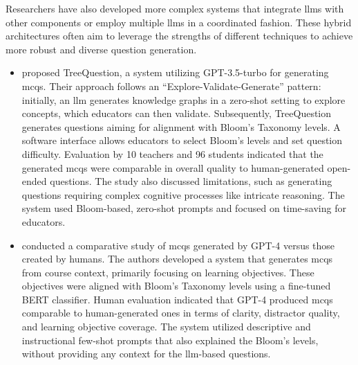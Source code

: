  Researchers have also developed more complex systems that integrate \ac{llms} with other components or employ multiple \ac{llms} in a coordinated fashion. These hybrid architectures often aim to leverage the strengths of different techniques to achieve more robust and diverse question generation.
\begin{itemize}
    \item \cite{cheng_treequestion_2024} proposed TreeQuestion, a system utilizing GPT-3.5-turbo for generating \ac{mcqs}. Their approach follows an \enquote{Explore-Validate-Generate} pattern: initially, an \ac{llm} generates knowledge graphs in a zero-shot setting to explore concepts, which educators can then validate. Subsequently, TreeQuestion generates questions aiming for alignment with Bloom's Taxonomy levels. A software interface allows educators to select Bloom's levels and set question difficulty. Evaluation by 10 teachers and 96 students indicated that the generated \ac{mcqs} were comparable in overall quality to human-generated open-ended questions. The study also discussed limitations, such as generating questions requiring complex cognitive processes like intricate reasoning. The system used Bloom-based, zero-shot prompts and focused on time-saving for educators.
    \item \cite{doughty_comparative_2024} conducted a comparative study of \ac{mcqs} generated by GPT-4 versus those created by humans. The authors developed a system that generates \ac{mcqs} from course context, primarily focusing on learning objectives. These objectives were aligned with Bloom's Taxonomy levels using a fine-tuned BERT classifier. Human evaluation indicated that GPT-4 produced \ac{mcqs} comparable to human-generated ones in terms of clarity, distractor quality, and learning objective coverage. The system utilized descriptive and instructional few-shot prompts that also explained the Bloom's levels, without providing any context for the \ac{llm}-based questions.

\end{itemize}
